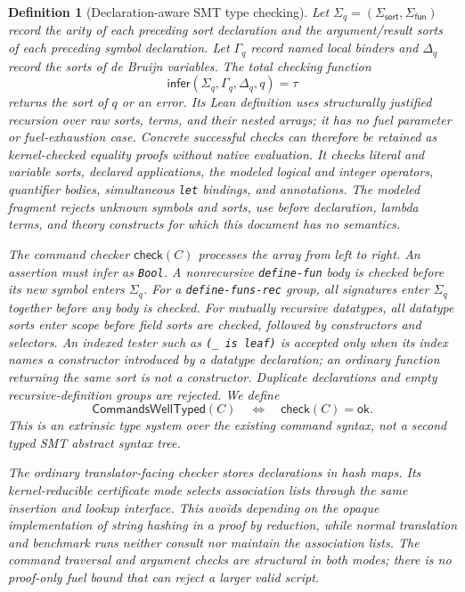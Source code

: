 \documentclass[11pt]{article}
\newtheorem{definition}{Definition}[section]
\theoremstyle{remark}
\begin{document}
\begin{definition}[Declaration-aware SMT type checking]
Let $\Sigma_q=(\Sigma_{\mathsf{sort}},\Sigma_{\mathsf{fun}})$ record the arity
of each preceding sort declaration and the argument/result sorts of each
preceding symbol declaration. Let $\Gamma_q$ record named local binders and
$\Delta_q$ record the sorts of de Bruijn variables. The total checking function
\[
 \mathsf{infer}(\Sigma_q,\Gamma_q,\Delta_q,q)=\tau
\]
returns the sort of $q$ or an error. Its Lean definition uses structurally
justified recursion over raw sorts, terms, and their nested arrays; it has no
fuel parameter or fuel-exhaustion case. Concrete successful checks can therefore
be retained as kernel-checked equality proofs without native evaluation. It
checks literal and variable sorts, declared applications, the modeled logical and integer operators,
quantifier bodies, simultaneous \texttt{let} bindings, and annotations. The
modeled fragment rejects unknown symbols and sorts, use before declaration,
lambda terms, and theory constructs for which this document has no semantics.

The command checker $\mathsf{check}(C)$ processes the array from left to right.
An assertion must infer as \texttt{Bool}. A nonrecursive \texttt{define-fun}
body is checked before its new symbol enters $\Sigma_q$. For a
\texttt{define-funs-rec} group, all signatures enter $\Sigma_q$ together before
any body is checked. For mutually recursive datatypes, all datatype sorts enter
scope before field sorts are checked, followed by constructors and selectors.
An indexed tester such as \texttt{(\_ is leaf)} is accepted only when its index
names a constructor introduced by a datatype declaration; an ordinary function
returning the same sort is not a constructor. Duplicate declarations and empty
recursive-definition groups are rejected.
We define
\[
 \mathsf{CommandsWellTyped}(C)
 \quad\Longleftrightarrow\quad
 \mathsf{check}(C)=\mathsf{ok}.
\]
This is an extrinsic type system over the existing command syntax, not a second
typed SMT abstract syntax tree.

The ordinary translator-facing checker stores declarations in hash maps. Its
kernel-reducible certificate mode selects association lists through the same
insertion and lookup interface. This avoids
depending on the opaque implementation of string hashing in a proof by
reduction, while normal translation and benchmark runs neither consult nor
maintain the association lists. The command traversal and argument checks are structural in both modes;
there is no proof-only fuel bound that can reject a larger valid script.


\end{definition}
\end{document}

